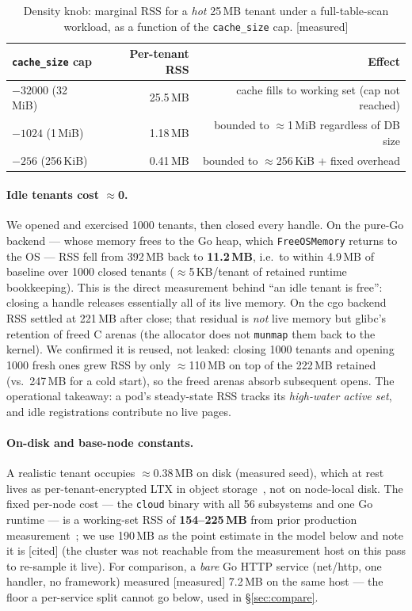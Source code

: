 \documentclass[11pt]{article}
\newcommand{\meas}{\textcolor{blue!60!black}{\small[measured]}}
\newcommand{\cited}{\textcolor{purple!70!black}{\small[cited]}}
\begin{document}
\begin{table}[h]
\centering
\caption{Density knob: marginal RSS for a \emph{hot} 25\,MB tenant under a full-table-scan
workload, as a function of the \texttt{cache\_size} cap. \meas{}}
\label{tab:knob}
\begin{tabular}{lrr}
\toprule
\texttt{cache\_size} cap & Per-tenant RSS & Effect \\
\midrule
$-32000$ (32\,MiB) & 25.5\,MB & cache fills to working set (cap not reached) \\
$-1024$ (1\,MiB)   & 1.18\,MB & bounded to $\approx$1\,MiB regardless of DB size \\
$-256$ (256\,KiB)  & 0.41\,MB & bounded to $\approx$256\,KiB + fixed overhead \\
\bottomrule
\end{tabular}
\end{table}

\paragraph{Idle tenants cost $\approx$0.}
We opened and exercised 1000 tenants, then closed every handle. On the pure-Go backend --- whose
memory frees to the Go heap, which \texttt{FreeOSMemory} returns to the OS --- RSS fell from
392\,MB back to \textbf{11.2\,MB}, i.e.\ to within 4.9\,MB of baseline over 1000 closed tenants
($\approx$5\,KB/tenant of retained runtime bookkeeping). This is the direct measurement behind
``an idle tenant is free'': closing a handle releases essentially all of its live memory. On the
cgo backend RSS settled at 221\,MB after close; that residual is \emph{not} live memory but
glibc's retention of freed C arenas (the allocator does not \texttt{munmap} them back to the
kernel). We confirmed it is reused, not leaked: closing 1000 tenants and opening 1000 fresh ones
grew RSS by only $\approx$110\,MB on top of the 222\,MB retained (vs.\ 247\,MB for a cold start),
so the freed arenas absorb subsequent opens. The operational takeaway: a pod's steady-state RSS
tracks its \emph{high-water active set}, and idle registrations contribute no live pages.

\paragraph{On-disk and base-node constants.}
A realistic tenant occupies $\approx$0.38\,MB on disk (measured seed), which at rest lives as
per-tenant-encrypted LTX in object storage~\cite{hip0032,hip0302}, not on node-local disk. The
fixed per-node cost --- the \texttt{cloud} binary with all 56 subsystems and one Go runtime --- is
a working-set RSS of \textbf{154--225\,MB} from prior production measurement~\cite{edgepaper};
we use 190\,MB as the point estimate in the model below and note it is \cited{} (the cluster was
not reachable from the measurement host on this pass to re-sample it live). For comparison, a
\emph{bare} Go HTTP service (net/http, one handler, no framework) measured \meas{} 7.2\,MB on the
same host --- the floor a per-service split cannot go below, used in \S\ref{sec:compare}.
\end{document}
